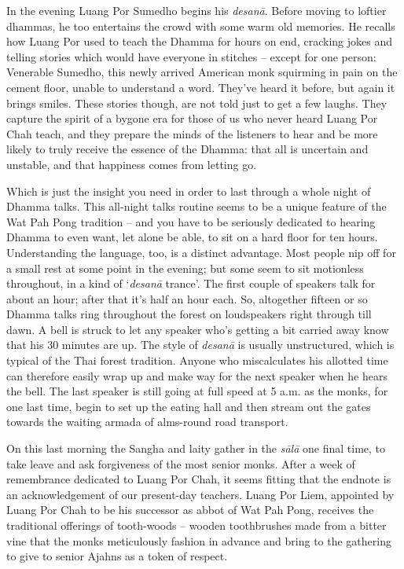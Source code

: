 In the evening Luang Por Sumedho begins his \emph{desanā}. Before moving
to loftier dhammas, he too entertains the crowd with some warm old
memories. He recalls how Luang Por used to teach the Dhamma for hours on
end, cracking jokes and telling stories which would have everyone in
stitches -- except for one person: Venerable Sumedho, this newly arrived
American monk squirming in pain on the cement floor, unable to
understand a word. They've heard it before, but again it brings smiles. 
These stories though, are not told just to get a few laughs. They
capture the spirit of a bygone era for those of us who never heard Luang
Por Chah teach, and they prepare the minds of the listeners to hear and
be more likely to truly receive the essence of the Dhamma: that all is
uncertain and unstable, and that happiness comes from letting go. 

Which is just the insight you need in order to last through a whole
night of Dhamma talks. This all-night talks routine seems to be a unique
feature of the Wat Pah Pong tradition -- and you have to be seriously
dedicated to hearing Dhamma to even want, let alone be able, to sit on a
hard floor for ten hours. Understanding the language, too, is a distinct
advantage. Most people nip off for a small rest at some point in the
evening; but some seem to sit motionless throughout, in a kind of
`\emph{desanā} trance'. The first couple of speakers talk for about an
hour; after that it's half an hour each. So, altogether fifteen or so
Dhamma talks ring throughout the forest on loudspeakers right through
till dawn. A bell is struck to let any speaker who's getting a bit
carried away know that his 30 minutes are up. The style of \emph{desanā}
is usually unstructured, which is typical of the Thai forest tradition. 
Anyone who miscalculates his allotted time can therefore easily wrap up
and make way for the next speaker when he hears the bell. The last
speaker is still going at full speed at 5 a.m. as the monks, for one
last time, begin to set up the eating hall and then stream out the gates
towards the waiting armada of alms-round road transport. 

On this last morning the Sangha and laity gather in the \emph{sālā} one
final time, to take leave and ask forgiveness of the most senior monks. 
After a week of remembrance dedicated to Luang Por Chah, it seems
fitting that the endnote is an acknowledgement of our present-day
teachers. Luang Por Liem, appointed by Luang Por Chah to be his
successor as abbot of Wat Pah Pong, receives the traditional offerings
of tooth-woods -- wooden toothbrushes made from a bitter vine that the
monks meticulously fashion in advance and bring to the gathering to give
to senior Ajahns as a token of respect. 

